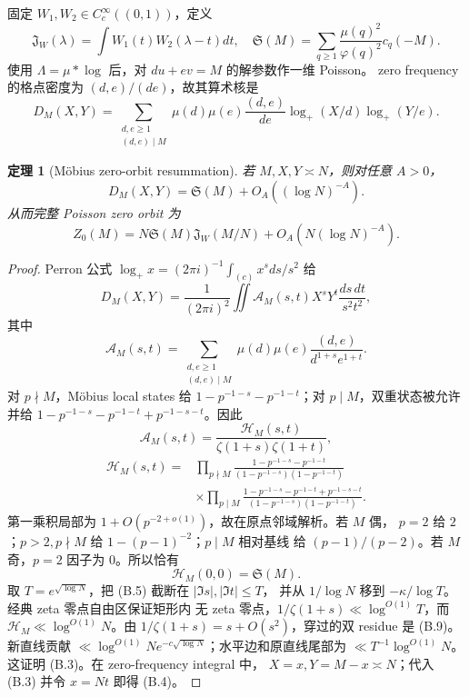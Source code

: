 \documentclass[11pt,a4paper]{ctexart}
\newtheorem{theorem}{定理}[section]
\theoremstyle{definition}
\newcommand{\1}{\mathbf 1}
\begin{document}
固定 $W_1,W_2\in C_c^\infty((0,1))$，定义
\[
\mathfrak J_W(\lambda)=\int W_1(t)W_2(\lambda-t)dt,
\quad
\mathfrak S(M)=\sum_{q\ge1}\frac{\mu(q)^2}{\varphi(q)^2}c_q(-M). \tag{B.1}
\]
使用 $\Lambda=\mu*\log$ 后，对 $du+ev=M$ 的解参数作一维 Poisson。
zero frequency 的格点密度为 $(d,e)/(de)$，故其算术核是
\[
D_M(X,Y)=\sum_{\substack{d,e\ge1\\(d,e)\mid M}}
\mu(d)\mu(e)\frac{(d,e)}{de}
\log_+(X/d)\log_+(Y/e).                                \tag{B.2}
\]

\begin{theorem}[Möbius zero-orbit resummation]
若 $M,X,Y\asymp N$，则对任意 $A>0$，
\[
\boxed{D_M(X,Y)=\mathfrak S(M)+O_A((\log N)^{-A}).}     \tag{B.3}
\]
从而完整 Poisson zero orbit 为
\[
\boxed{Z_0(M)=N\mathfrak S(M)\mathfrak J_W(M/N)
+O_A(N(\log N)^{-A}).}                                 \tag{B.4}
\]
\end{theorem}

\begin{proof}
Perron 公式 $\log_+x=(2\pi i)^{-1}\int_{(c)}x^sds/s^2$ 给
\[
D_M(X,Y)=\frac1{(2\pi i)^2}\iint
\mathcal A_M(s,t)X^sY^t\frac{ds\,dt}{s^2t^2},          \tag{B.5}
\]
其中
\[
\mathcal A_M(s,t)=\sum_{\substack{d,e\ge1\\(d,e)\mid M}}
\mu(d)\mu(e)\frac{(d,e)}{d^{1+s}e^{1+t}}.              \tag{B.6}
\]
对 $p\nmid M$，Möbius local states 给
$1-p^{-1-s}-p^{-1-t}$；对 $p\mid M$，双重状态被允许并给
$1-p^{-1-s}-p^{-1-t}+p^{-1-s-t}$。因此
\[
\mathcal A_M(s,t)=\frac{\mathcal H_M(s,t)}
{\zeta(1+s)\zeta(1+t)},                                \tag{B.7}
\]
\begin{align*}
\mathcal H_M(s,t)
={}&\prod_{p\nmid M}\frac{1-p^{-1-s}-p^{-1-t}}
{(1-p^{-1-s})(1-p^{-1-t})}\\
&\times\prod_{p\mid M}
\frac{1-p^{-1-s}-p^{-1-t}+p^{-1-s-t}}
{(1-p^{-1-s})(1-p^{-1-t})}.                            \tag{B.8}
\end{align*}
第一乘积局部为 $1+O(p^{-2+o(1)})$，故在原点邻域解析。若 $M$ 偶，
$p=2$ 给 $2$；$p>2,p\nmid M$ 给 $1-(p-1)^{-2}$；$p\mid M$ 相对基线
给 $(p-1)/(p-2)$。若 $M$ 奇，$p=2$ 因子为 $0$。所以恰有
\[
\mathcal H_M(0,0)=\mathfrak S(M).                      \tag{B.9}
\]
取 $T=e^{\sqrt{\log N}}$，把 (B.5) 截断在 $|\Im s|,|\Im t|\le T$，
并从 $1/\log N$ 移到 $-\kappa/\log T$。经典 zeta 零点自由区保证矩形内
无 zeta 零点，$1/\zeta(1+s)\ll\log^{O(1)}T$，而
$\mathcal H_M\ll\log^{O(1)}N$。由
$1/\zeta(1+s)=s+O(s^2)$，穿过的双 residue 是 (B.9)。新直线贡献
$\ll\log^{O(1)}N e^{-c\sqrt{\log N}}$；水平边和原直线尾部为
$\ll T^{-1}\log^{O(1)}N$。这证明 (B.3)。在 zero-frequency integral 中，
$X=x,Y=M-x\asymp N$；代入 (B.3) 并令 $x=Nt$ 即得 (B.4)。
\end{proof}
\end{document}
